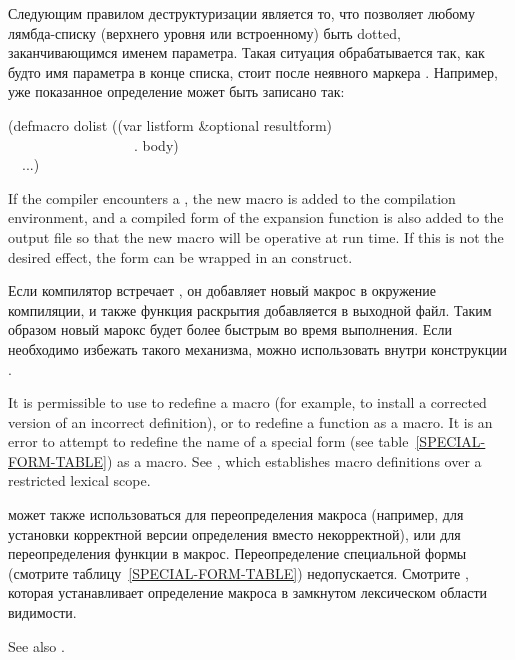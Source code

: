 \begin{defmac}
Следующим правилом деструктуризации является то, что  позволяет
любому лямбда-списку (верхнего уровня или встроенному) быть dotted,
заканчивающимся именем параметра. Такая ситуация обрабатывается так, как будто
имя параметра в конце списка, стоит после неявного маркера .
Например, уже показанное определение  может быть записано так:
\begin{lisp}
(defmacro dolist ((var listform \&optional resultform) \\
~~~~~~~~~~~~~~~~~~. body) \\
~~...)
\end{lisp}


If the compiler encounters a ,
the new macro is added to the compilation
environment, and a compiled form of the expansion function is also added
to the output file so that the new macro will be operative at run time.
If this is not the desired effect, the  form can be wrapped
in an  construct.

Если компилятор встречает , он добавляет новый макрос в окружение
компиляции, и также функция раскрытия добавляется в выходной файл. Таким образом
новый марокс будет более быстрым во время выполнения.
Если необходимо избежать такого механизма, можно использовать 
внутри конструкции .

It is permissible to use  to redefine a macro
(for example, to install
a corrected version of an incorrect definition), or to redefine
a function as a macro.
It is an error to attempt to redefine the name of a special
form (see table~\ref{SPECIAL-FORM-TABLE}) as a macro.
See , which establishes macro
definitions over a restricted lexical scope.

 может также использоваться для переопределения макроса
(например, для установки корректной версии определения вместо некорректной), или
для переопределения функции в макрос.
Переопределение специальной формы (смотрите таблицу~\ref{SPECIAL-FORM-TABLE})
недопускается.
Смотрите , которая устанавливает определение макроса в замкнутом
лексическом области видимости.

\begin{newer}
See also .
\end{newer}


\end{defmac}
